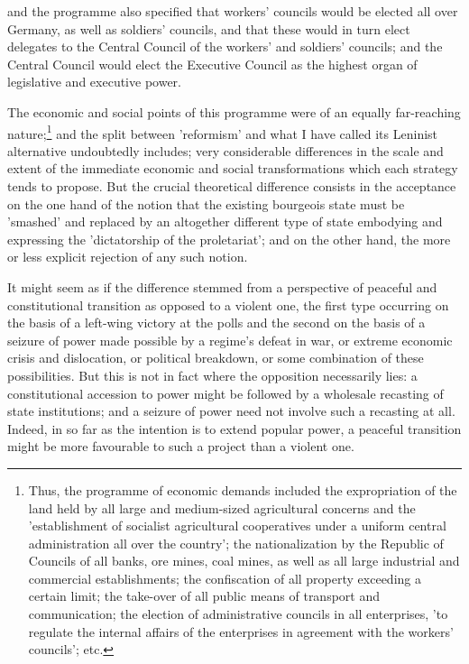 and the programme also specified that workers' councils would be elected all over Germany, as well as soldiers' councils, and that these would in turn elect delegates to the Central Council of the workers' and soldiers' councils; and the Central Council would elect the Executive Council as the highest organ of legislative and executive power.

The economic and social points of this programme were of an equally far-reaching nature;\footnote{Thus, the programme of economic demands included the expropriation of the land held by all large and medium-sized agricultural concerns and the 'establishment of socialist agricultural cooperatives under a uniform central administration all over the country'; the nationalization by the Republic of Councils of all banks, ore mines, coal mines, as well as all large industrial and commercial establishments; the confiscation of all property exceeding a certain limit; the take\hyp{}over of all public means of transport and communication; the election of administrative councils in all enterprises, 'to regulate the internal affairs of the enterprises in agreement with the workers' councils'; etc.} and the split between 'reformism' and what I have called its Leninist alternative undoubtedly includes; very considerable differences in the scale and extent of the immediate economic and social transformations which each strategy tends to propose. But the crucial theoretical difference consists in the acceptance on the one hand of the notion that the existing bourgeois state must be 'smashed' and replaced by an altogether different type of state embodying and expressing the 'dictatorship of the proletariat'; and on the other hand, the more or less explicit rejection of any such notion.

It might seem as if the difference stemmed from a perspective of peaceful and constitutional transition as opposed to a violent one, the first type occurring on the basis of a left-wing victory at the polls and the second on the basis of a seizure of power made possible by a regime's defeat in war, or extreme economic crisis and dislocation, or political breakdown, or some combination of these possibilities. But this is not in fact where the opposition necessarily lies: a constitutional accession to power might be followed by a wholesale recasting of state institutions; and a seizure of power need not involve such a recasting at all. Indeed, in so far as the intention is to extend popular power, a peaceful transition might be more favourable to such a project than a violent one.

